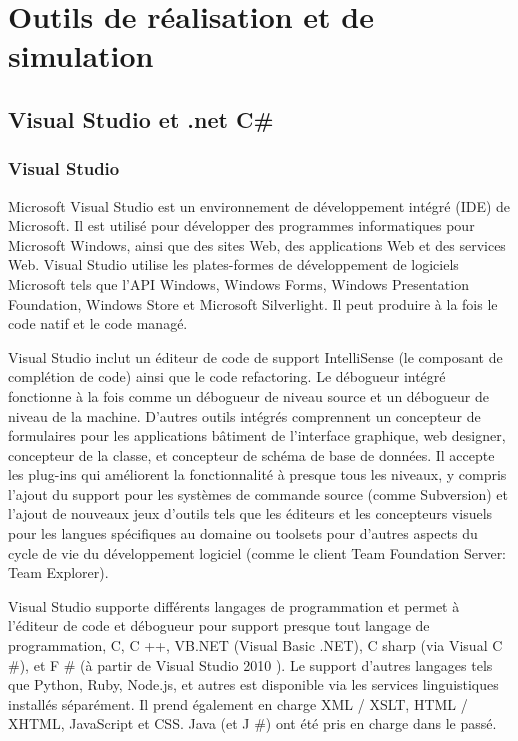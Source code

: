 \documentclass[11pt, a4paper, twoside]{book}
\begin{document}
\section{Outils	de	réalisation	et de	simulation}
\subsection{Visual Studio et .net C\#}
\subsubsection{Visual Studio}
Microsoft Visual Studio est un environnement de développement intégré (IDE) de Microsoft. Il est utilisé pour développer des programmes informatiques pour Microsoft Windows, ainsi que des sites Web, des applications Web et des services Web. Visual Studio utilise les plates-formes de développement de logiciels Microsoft tels que l'API Windows, Windows Forms, Windows Presentation Foundation, Windows Store et Microsoft Silverlight. Il peut produire à la fois le code natif et le code managé.

Visual Studio inclut un éditeur de code de support IntelliSense (le composant de complétion de code) ainsi que le code refactoring. Le débogueur intégré fonctionne à la fois comme un débogueur de niveau source et un débogueur de niveau de la machine. D'autres outils intégrés comprennent un concepteur de formulaires pour les applications bâtiment de l'interface graphique, web designer, concepteur de la classe, et concepteur de schéma de base de données. Il accepte les plug-ins qui améliorent la fonctionnalité à presque tous les niveaux, y compris l'ajout du support pour les systèmes de commande source (comme Subversion) et l'ajout de nouveaux jeux d'outils tels que les éditeurs et les concepteurs visuels pour les langues spécifiques au domaine ou toolsets pour d'autres aspects du cycle de vie du développement logiciel (comme le client Team Foundation Server: Team Explorer).

Visual Studio supporte différents langages de programmation et permet à l'éditeur de code et débogueur pour support  presque tout langage de programmation, C, C ++, VB.NET (Visual Basic .NET), C sharp (via Visual C \#), et F \# (à partir de Visual Studio 2010  ). Le support d'autres langages tels que Python, Ruby, Node.js, et autres est disponible via les services linguistiques installés séparément. Il prend également en charge XML / XSLT, HTML / XHTML, JavaScript et CSS. Java (et J \#) ont été pris en charge dans le passé.
\end{document}
